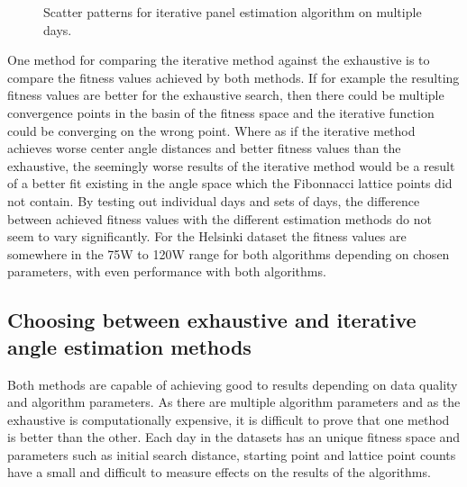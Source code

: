 \begin{figure}[H]
     
\caption{Scatter patterns for iterative panel estimation algorithm on multiple days.}




     \label{fig_iterative_visual_1}
\end{figure}

\noindent One method for comparing the iterative method against the exhaustive is to compare the fitness values achieved by both methods. If for example the resulting fitness values are better for the exhaustive search, then there could be multiple convergence points in the basin of the fitness space and the iterative function could be converging on the wrong point. Where as if the iterative method achieves worse center angle distances and better fitness values than the exhaustive, the seemingly worse results of the iterative method would be a result of a better fit existing in the angle space which the Fibonnacci lattice points did not contain. By testing out individual days and sets of days, the difference between achieved fitness values with the different estimation methods do not seem to vary significantly. For the Helsinki dataset the fitness values are somewhere in the 75W to 120W range for both algorithms depending on chosen parameters, with even performance with both algorithms.



\subsection{Choosing between exhaustive and iterative angle estimation methods}
Both methods are capable of achieving good to results depending on data quality and algorithm parameters. As there are multiple algorithm parameters and as the exhaustive is computationally expensive, it is difficult to prove that one method is better than the other. Each day in the datasets has an unique fitness space and parameters such as initial search distance, starting point and lattice point counts have a small and difficult to measure effects on the results of the algorithms.


